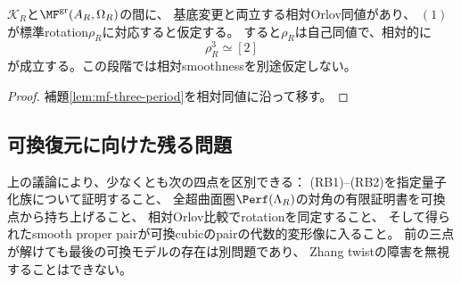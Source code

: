 \begin{corollary}[相対Orlov比較の下でのrotation]
\label{cor:relative-rotation-period}
$\mathcal K_R$と$\MF^{\mathrm{gr}}(A_R,\Omega_R)$の間に、
基底変更と両立する相対Orlov同値があり、
$(1)$が標準rotation$\rho_R$に対応すると仮定する。
すると$\rho_R$は自己同値で、相対的に
\[
\rho_R^3\simeq[2]
\]
が成立する。この段階では相対smoothnessを別途仮定しない。
\end{corollary}
\begin{proof}
補題\ref{lem:mf-three-period}を相対同値に沿って移す。
\end{proof}

\subsection{可換復元に向けた残る問題}
上の議論により、少なくとも次の四点を区別できる：
(RB1)--(RB2)を指定量子化族について証明すること、
全超曲面圏$\Perf(\Lambda_R)$の対角の有限証明書を可換点から持ち上げること、
相対Orlov比較でrotationを同定すること、
そして得られたsmooth proper pairが可換cubicのpairの代数的変形像に入ること。
前の三点が解けても最後の可換モデルの存在は別問題であり、
Zhang twistの障害を無視することはできない。
